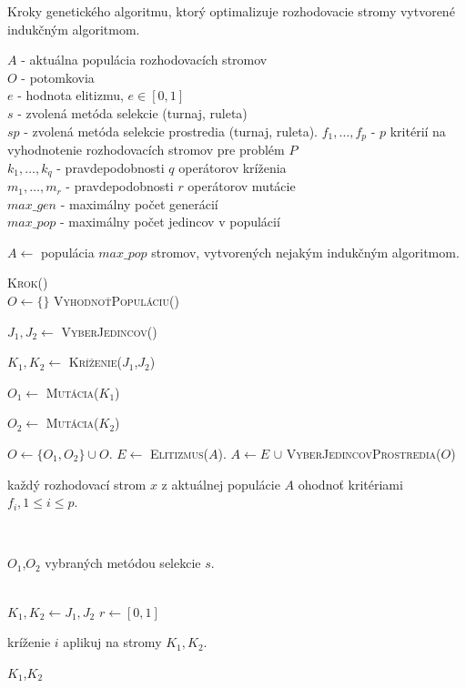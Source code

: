 \begin{algorithm}
\caption{Kroky genetického algoritmu, ktorý optimalizuje rozhodovacie stromy vytvorené indukčným algoritmom.}\label{fig:DTGeneticAlgo}
$A$ - aktuálna populácia rozhodovacích stromov \\
$O$ - potomkovia \\
$e$ - hodnota elitizmu, $e \in [0,1]$ \\
$s$ - zvolená metóda selekcie (turnaj, ruleta) \\
$sp$ - zvolená metóda selekcie prostredia (turnaj, ruleta).
$f_1,\ldots,f_p$ - $p$ kritérií na vyhodnotenie rozhodovacích stromov pre problém $P$\\
$k_{1},\ldots,k_{q}$ - pravdepodobnosti $q$ operátorov kríženia\\
$m_{1},\ldots,m_{r}$ - pravdepodobnosti $r$ operátorov mutácie\\
$max\_gen$ - maximálny počet generácií \\
$max\_pop$ - maximálny počet jedincov v populácií \\
\bigskip
\begin{algorithmic}[1]
\State \parbox[t]{400pt}{$A \gets $ populácia $max\_pop$ stromov, vytvorených nejakým indukčným algoritmom.}
	\State \textsc{Krok()}
\EndFor
\\
	\State $O \gets \{\}$
	\State \textsc{VyhodnoťPopuláciu()}
		\State \parbox[t]{350pt}{$J_1,J_2 \gets $ \textsc{VyberJedincov()}}
		\State \parbox[t]{350pt}{$K_1,K_2 \gets $ \textsc{Kríženie($J_1$,$J_2$)}}
		\State \parbox[t]{350pt}{$O_1 \gets $ \textsc{Mutácia($K_1$)}}
		\State \parbox[t]{350pt}{$O_2 \gets $ \textsc{Mutácia($K_2$)}}		
		\State $O \gets \{O_1,O_2\} \cup O$.
	\EndWhile
	\State $E \gets$ \textsc{Elitizmus($A$)}.
	\State $A \gets  E$ $\cup$ \textsc{VyberJedincovProstredia($O$)} 
\EndProcedure
\\
\State \parbox[t]{350pt}{každý rozhodovací strom $x$ z aktuálnej populácie $A$ ohodnoť kritériami $f_i, 1 \leq i \leq p$.}
\EndProcedure
\\
\State \Return \parbox[t]{300pt}{$O_1$,$O_2$ vybraných metódou selekcie $s$.}
\EndFunction
\\
\State $K_1, K_2 \gets J_1, J_2$
\State $r \gets [0,1]$
	\State \parbox[t]{300pt}{kríženie $i$ aplikuj na stromy $K_1, K_2$.}
\EndIf
\State \Return $K_1$,$K_2$
\EndFor 
\EndFunction
{}
\end{algorithmic}
\end{algorithm}

